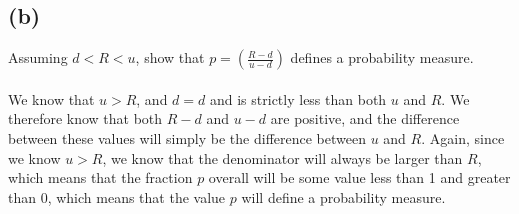 \documentclass{article}
\begin{document}
{\subsection*{(b)}

Assuming $d < R < u$, show that $p = (\frac{R - d}{u - d})$ defines a probability measure. \\ \\

We know that $u > R$, and $d = d$ and is strictly less than both $u$ and $R$. We therefore know that both $R-d$ and $u-d$ are positive, and the difference between these values will simply be the difference between $u$ and $R$. Again, since we know $u > R$, we know that the denominator will always be larger than $R$, which means that the fraction $p$ overall will be some value less than 1 and greater than 0, which means that the value $p$ will define a probability measure. 

}
\end{document}
